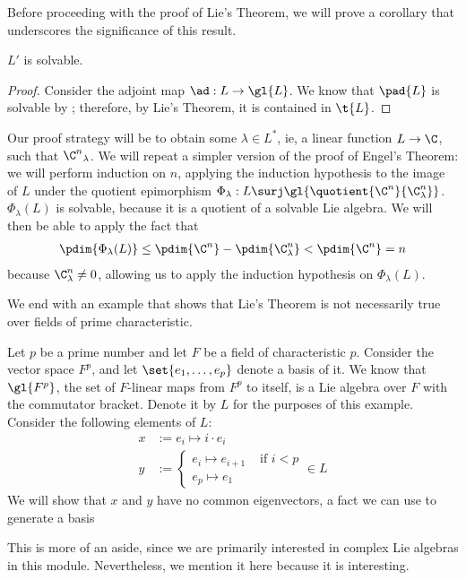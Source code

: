 Before proceeding with the proof of Lie's Theorem, we will prove a corollary that underscores the significance of this result.

\begin{boxcorollary}\label{Ch1:Cor:SolvableDerivNilpotent}
    $L'$ is solvable.
\end{boxcorollary}
\begin{proof}
    Consider the adjoint map $\ad : L \to \gl{L}$. We know that $\pad{L}$ is solvable by \sorry; therefore, by Lie's Theorem, it is contained in $\t{L}$. %
    \sorry
\end{proof}

Our proof strategy will be to obtain some $\lambda \in L^*$, ie, a linear function $L \to \C$, such that ${\C^n}_{\lambda}$. We will repeat a simpler version of the proof of Engel's Theorem: we will perform induction on $n$, applying the induction hypothesis to the image of $L$ under the quotient epimorphism $\Phi_\lambda : L \surj \gl{\quotient{\C^n}{\C^n_\lambda}}$. $\Phi_\lambda(L)$ is solvable, because it is a quotient of a solvable Lie algebra. We will then be able to apply the fact that
\begin{align*}
    \pdim{\Phi_\lambda(L)}
    \leq \pdim{\C^n} - \pdim{\C^n_\lambda}
    < \pdim{\C^n} = n
\end{align*}
because $\C^n_{\lambda} \neq 0$, allowing us to apply the induction hypothesis on $\Phi_\lambda(L)$.

\sorry

We end with an example that shows that Lie's Theorem is not necessarily true over fields of prime characteristic.

\begin{boxcexample}
    Let $p$ be a prime number and let $F$ be a field of characteristic $p$. Consider the vector space $F^p$, and let $\set{e_1, \ldots, e_p}$ denote a basis of it. We know that $\gl{F^p}$, the set of $F$-linear maps from $F^p$ to itself, is a Lie algebra over $F$ with the commutator bracket. Denote it by $L$ for the purposes of this example. \\

    Consider the following elements of $L$:
    \begin{align*}
        x &:= e_i \mapsto i \cdot e_{i} \\
        y &:=
        \begin{cases}
            e_i \mapsto e_{i+1} & \text{ if } i < p \\
            e_p \mapsto e_1
        \end{cases}
         \in L
    \end{align*}
    We will show that $x$ and $y$ have no common eigenvectors, a fact we can use to generate a basis 
\end{boxcexample}

This is more of an aside, since we are primarily interested in complex Lie algebras in this module. Nevertheless, we mention it here because it is interesting.
